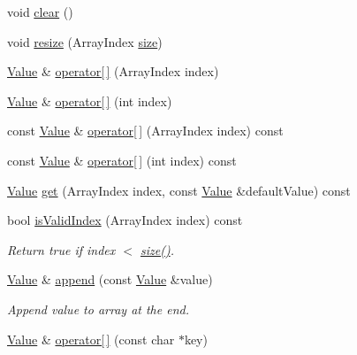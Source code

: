 \begin{DoxyCompactItemize}
void \hyperlink{class_json_1_1_value_a501a4d67e6c875255c2ecc03ccd2019b}{clear} ()
\item 
void \hyperlink{class_json_1_1_value_aa284353271ada427dbfa04a42f2be407}{resize} (Array\+Index \hyperlink{class_json_1_1_value_a0ec2808e1d7efa4e9fad938d6667be44}{size})
\item 
\hyperlink{class_json_1_1_value}{Value} \& \hyperlink{class_json_1_1_value_a7d99f5dba388cdaa152ce6ef933d64ef}{operator\mbox{[}$\,$\mbox{]}} (Array\+Index index)
\item 
\hyperlink{class_json_1_1_value}{Value} \& \hyperlink{class_json_1_1_value_ac9182982c361e0ab621134d406e5f250}{operator\mbox{[}$\,$\mbox{]}} (int index)
\item 
const \hyperlink{class_json_1_1_value}{Value} \& \hyperlink{class_json_1_1_value_a46607236038b29695ed80c15895271e4}{operator\mbox{[}$\,$\mbox{]}} (Array\+Index index) const
\item 
const \hyperlink{class_json_1_1_value}{Value} \& \hyperlink{class_json_1_1_value_a0b42557a95621a4676b46a21ffc5e949}{operator\mbox{[}$\,$\mbox{]}} (int index) const
\item 
\hyperlink{class_json_1_1_value}{Value} \hyperlink{class_json_1_1_value_a034eb7bf85a44fa759bdaa232788ca66}{get} (Array\+Index index, const \hyperlink{class_json_1_1_value}{Value} \&default\+Value) const
\item 
\mbox{\label{class_json_1_1_value_ac2928f174a6e081c1500c28c2d61ee93}} 
bool \hyperlink{class_json_1_1_value_ac2928f174a6e081c1500c28c2d61ee93}{is\+Valid\+Index} (Array\+Index index) const
\begin{DoxyCompactList}\small\item\em Return true if index $<$ \hyperlink{class_json_1_1_value_a0ec2808e1d7efa4e9fad938d6667be44}{size()}. \end{DoxyCompactList}\item 
\hyperlink{class_json_1_1_value}{Value} \& \hyperlink{class_json_1_1_value_a7e49ac977e4bcf59745a09d426669f75}{append} (const \hyperlink{class_json_1_1_value}{Value} \&value)
\begin{DoxyCompactList}\small\item\em Append value to array at the end. \end{DoxyCompactList}\item 
\hyperlink{class_json_1_1_value}{Value} \& \hyperlink{class_json_1_1_value_acb912f4ec40a25ea6eb387730885f3d9}{operator\mbox{[}$\,$\mbox{]}} (const char $\ast$key)

\end{DoxyCompactItemize}
